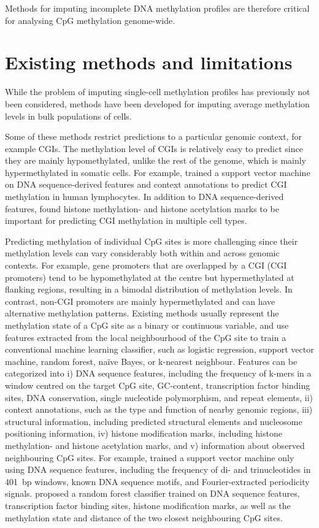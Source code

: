 Methods for imputing incomplete DNA methylation profiles are therefore critical for analysing CpG methylation genome-wide.


\section{Existing methods and limitations}

While the problem of imputing single-cell methylation profiles has previously not been considered, methods have been developed for imputing average methylation levels in bulk populations of cells.

Some of these methods restrict predictions to a particular genomic context, for example CGIs. The methylation level of CGIs is relatively easy to predict since they are mainly hypomethylated, unlike the rest of the genome, which is mainly hypermethylated in somatic cells. For example, \citet{bock_cpg_2006} trained a support vector machine on DNA sequence-derived features and context annotations to predict CGI methylation in human lymphocytes. In addition to DNA sequence-derived features, \citet{zheng_cpgimethpred:_2013} found histone methylation- and histone acetylation marks to be important for predicting CGI methylation in multiple cell types.

Predicting methylation of individual CpG sites is more challenging since their methylation levels can vary considerably both within and across genomic contexts. For example, gene promoters that are overlapped by a CGI (CGI promoters) tend to be hypomethylated at the centre but hypermethylated at flanking regions, resulting in a bimodal distribution of methylation levels. In contrast, non-CGI promoters are mainly hypermethylated and can have alternative methylation patterns. Existing methods usually represent the methylation state of a CpG site as a binary or continuous variable, and use features extracted from the local neighbourhood of the CpG site to train a conventional machine learning classifier, such as logistic regression, support vector machine, random forest, na\"ive Bayes, or k-nearest neighbour. Features can be categorized into i) DNA sequence features, including the frequency of k-mers in a window centred on the target CpG site, GC-content, transcription factor binding sites, DNA conservation, single nucleotide polymorphism, and repeat elements, ii) context annotations, such as the type and function of nearby genomic regions, iii) structural information, including predicted structural elements and nucleosome positioning information, iv) histone modification marks, including histone methylation- and histone acetylation marks, and v) information about observed neighbouring CpG sites. For example, \citet{malousi_predictive_2014} trained a support vector machine only using DNA sequence features, including the frequency of di- and trinucleotides in 401~bp windows, known DNA sequence motifs, and Fourier-extracted periodicity signals. \citet{zhang_predicting_2015} proposed a random forest classifier trained on DNA sequence features, transcription factor binding sites, histone modification marks, as well as the methylation state and distance of the two closest neighbouring CpG sites.

